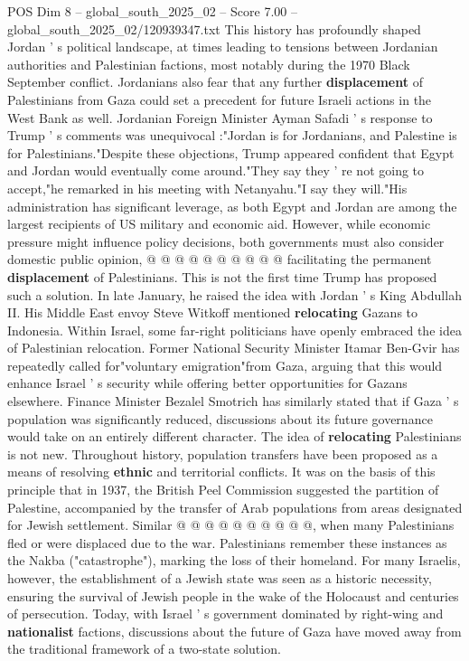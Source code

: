 \begin{textsample}{POS Dim 8 – global\_south\_2025\_02 – Score 7.00 – global\_south\_2025\_02/120939347.txt}
This history has profoundly shaped Jordan ' s political landscape, at times leading to tensions between Jordanian authorities and Palestinian factions, most notably during the 1970 Black September conflict.
Jordanians also fear that any further \textbf{displacement} of Palestinians from Gaza could set a precedent for future Israeli actions in the West Bank as well.
Jordanian Foreign Minister Ayman Safadi ' s response to Trump ' s comments was unequivocal :"Jordan is for Jordanians, and Palestine is for Palestinians."Despite these objections, Trump appeared confident that Egypt and Jordan would eventually come around."They say they ' re not going to accept,"he remarked in his meeting with Netanyahu."I say they will."His administration has significant leverage, as both Egypt and Jordan are among the largest recipients of US military and economic aid.
However, while economic pressure might influence policy decisions, both governments must also consider domestic public opinion, @ @ @ @ @ @ @ @ @ @ facilitating the permanent \textbf{displacement} of Palestinians.
This is not the first time Trump has proposed such a solution.
In late January, he raised the idea with Jordan ' s King Abdullah II.
His Middle East envoy Steve Witkoff mentioned \textbf{relocating} Gazans to Indonesia.
Within Israel, some far-right politicians have openly embraced the idea of Palestinian relocation.
Former National Security Minister Itamar Ben-Gvir has repeatedly called for"voluntary emigration"from Gaza, arguing that this would enhance Israel ' s security while offering better opportunities for Gazans elsewhere.
Finance Minister Bezalel Smotrich has similarly stated that if Gaza ' s population was significantly reduced, discussions about its future governance would take on an entirely different character.
The idea of \textbf{relocating} Palestinians is not new.
Throughout history, population transfers have been proposed as a means of resolving \textbf{ethnic} and territorial conflicts.
It was on the basis of this principle that in 1937, the British Peel Commission suggested the partition of Palestine, accompanied by the transfer of Arab populations from areas designated for Jewish settlement.
Similar @ @ @ @ @ @ @ @ @ @, when many Palestinians fled or were displaced due to the war.
Palestinians remember these instances as the Nakba ("catastrophe"), marking the loss of their homeland.
For many Israelis, however, the establishment of a Jewish state was seen as a historic necessity, ensuring the survival of Jewish people in the wake of the Holocaust and centuries of persecution.
Today, with Israel ' s government dominated by right-wing and \textbf{nationalist} factions, discussions about the future of Gaza have moved away from the traditional framework of a two-state solution.

\end{textsample}
